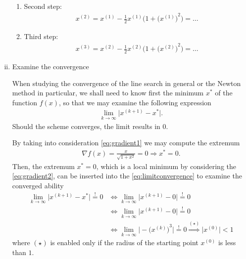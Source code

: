 \documentclass[12pt]{article}
\begin{document}
\begin{enumerate}[(i)]
\begin{enumerate}
		      \item Second step:
		            \begin{align}
			            x^{(2)} 
			            = x^{(1)} - \frac{1}{2} x^{(1)} \Bigg(1 + {\Big(x^{(1)}\Big)}^2 \Bigg)
			            = \dots
		            \end{align}
		            
		      \item Third step:
		            \begin{align}
			            x^{(3)} 
			            = x^{(2)} - \frac{1}{2} x^{(2)} \Bigg(1 + {\Big(x^{(2)}\Big)}^2 \Bigg)
			            = \dots
		            \end{align}
	      \end{enumerate}
	      
	\item Examine the convergence
	      \begin{observationboxed}
		      When studying the convergence of the line search in general or 
		      the Newton method in particular,
		      we shall need to know first the minimum $x^*$ of the function $f(x)$,
		      so that we may examine the following expression
		      \begin{align}
			      \label{eq:limitconvergence}
			      \lim_{k \to \infty} \Big| x^{(k+1)} - x^* \Big|.
		      \end{align}
		      Should the scheme converges, the limit results in $0$.
	      \end{observationboxed}
	      By taking into consideration \eqref{eq:gradient1}
	      we may compute the extremum 
	      \begin{align}
		      \nabla f (x)  
		      = 
		      \frac{x}{\sqrt{1+x^2}}
		      = 0
		      \Rightarrow
		      x^* = 0.
	      \end{align}
	      Then, the extremum $x^* = 0$, which is a local minimum
	      by considering the \eqref{eq:gradient2},
	      can be inserted into the 
	      \eqref{eq:limitconvergence}
	      to examine the converged ability
	      \begin{align}
		      \lim_{k \to \infty} \Big| x^{(k+1)} - x^* \Big| \stackrel{!}{=} 0
		       & \Leftrightarrow
		      \lim_{k \to \infty} \Big| x^{(k+1)} - 0 \Big| \stackrel{!}{=} 0                                 \\
		       & \Leftrightarrow
		      \lim_{k \to \infty} \Big| x^{(k+1)} - 0 \Big| \stackrel{!}{=} 0                                 \\
		       & \Leftrightarrow \lim_{k \to \infty} \Big| - { \Big( x^{(k)} \Big)}^3 \Big| \stackrel{!}{=} 0
		      \stackrel{(\star)}{\Rightarrow}
		      \big| x^{(0)} \big|  < 1
	      \end{align}
	      where $(\star)$ is enabled only if the radius of the starting point $x^{(0)}$ is less than $1$.
	      

\end{enumerate}
\end{document}
